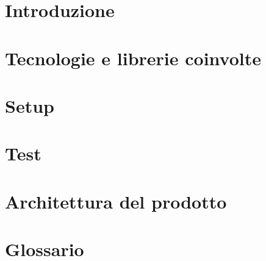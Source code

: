 \documentclass{article}
\begin{document}


\section{Introduzione}
\label{sec:introduzione}


\newpage
\section{Tecnologie e librerie coinvolte}
\label{sec:tech}


\newpage
\section{Setup}
\label{sec:setup}


\newpage
\section{Test}
\label{sec:test}


\newpage
\section{Architettura del prodotto}
\label{sec:arch}

%
%

\newpage
\section{Glossario}
\label{sec:glossario}

\end{document}

